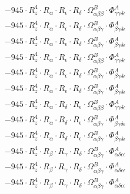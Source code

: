 \documentclass{article}
\begin{document}
\begin{subequations}
\begin{gather}
\begin{array}{c}
 \\[0.2em] 		 - 945 \cdot R_{z}^{4} \cdot R_{\alpha{}} \cdot R_{\epsilon{}} \cdot R_{\delta{}} \cdot \Omega{}^{B}_{\alpha{}\beta{}\beta{}} \cdot \Phi{}^{A}_{\gamma{}\gamma{}\delta{}\epsilon{}} 
 \\[0.2em] 		 - 945 \cdot R_{z}^{4} \cdot R_{\alpha{}} \cdot R_{\epsilon{}} \cdot R_{\delta{}} \cdot \Omega{}^{B}_{\alpha{}\beta{}\gamma{}} \cdot \Phi{}^{A}_{\beta{}\gamma{}\delta{}\epsilon{}} 
 \\[0.2em] 		 - 945 \cdot R_{z}^{4} \cdot R_{\alpha{}} \cdot R_{\epsilon{}} \cdot R_{\delta{}} \cdot \Omega{}^{B}_{\alpha{}\beta{}\gamma{}} \cdot \Phi{}^{A}_{\beta{}\gamma{}\delta{}\epsilon{}} 
 \\[0.2em] 		 - 945 \cdot R_{z}^{4} \cdot R_{\alpha{}} \cdot R_{\epsilon{}} \cdot R_{\delta{}} \cdot \Omega{}^{B}_{\alpha{}\beta{}\beta{}} \cdot \Phi{}^{A}_{\gamma{}\gamma{}\delta{}\epsilon{}} 
 \\[0.2em] 		 - 945 \cdot R_{z}^{4} \cdot R_{\alpha{}} \cdot R_{\epsilon{}} \cdot R_{\delta{}} \cdot \Omega{}^{B}_{\alpha{}\beta{}\gamma{}} \cdot \Phi{}^{A}_{\beta{}\gamma{}\delta{}\epsilon{}} 
 \\[0.2em] 		 - 945 \cdot R_{z}^{4} \cdot R_{\alpha{}} \cdot R_{\epsilon{}} \cdot R_{\delta{}} \cdot \Omega{}^{B}_{\alpha{}\beta{}\gamma{}} \cdot \Phi{}^{A}_{\beta{}\gamma{}\delta{}\epsilon{}} 
 \\[0.2em] 		 - 945 \cdot R_{z}^{4} \cdot R_{\alpha{}} \cdot R_{\delta{}} \cdot R_{\epsilon{}} \cdot \Omega{}^{B}_{\alpha{}\beta{}\beta{}} \cdot \Phi{}^{A}_{\gamma{}\gamma{}\delta{}\epsilon{}} 
 \\[0.2em] 		 - 945 \cdot R_{z}^{4} \cdot R_{\alpha{}} \cdot R_{\delta{}} \cdot R_{\epsilon{}} \cdot \Omega{}^{B}_{\alpha{}\beta{}\gamma{}} \cdot \Phi{}^{A}_{\beta{}\gamma{}\delta{}\epsilon{}} 
 \\[0.2em] 		 - 945 \cdot R_{z}^{4} \cdot R_{\alpha{}} \cdot R_{\delta{}} \cdot R_{\epsilon{}} \cdot \Omega{}^{B}_{\alpha{}\beta{}\gamma{}} \cdot \Phi{}^{A}_{\beta{}\gamma{}\delta{}\epsilon{}} 
 \\[0.2em] 		 - 945 \cdot R_{z}^{4} \cdot R_{\beta{}} \cdot R_{\gamma{}} \cdot R_{\delta{}} \cdot \Omega{}^{B}_{\alpha{}\beta{}\gamma{}} \cdot \Phi{}^{A}_{\alpha{}\delta{}\epsilon{}\epsilon{}} 
 \\[0.2em] 		 - 945 \cdot R_{z}^{4} \cdot R_{\beta{}} \cdot R_{\gamma{}} \cdot R_{\delta{}} \cdot \Omega{}^{B}_{\alpha{}\beta{}\gamma{}} \cdot \Phi{}^{A}_{\alpha{}\delta{}\epsilon{}\epsilon{}} 
 \\[0.2em] 		 - 945 \cdot R_{z}^{4} \cdot R_{\beta{}} \cdot R_{\gamma{}} \cdot R_{\delta{}} \cdot \Omega{}^{B}_{\alpha{}\beta{}\gamma{}} \cdot \Phi{}^{A}_{\alpha{}\delta{}\epsilon{}\epsilon{}} 

\end{array}
\end{gather}
\end{subequations}
\end{document}

